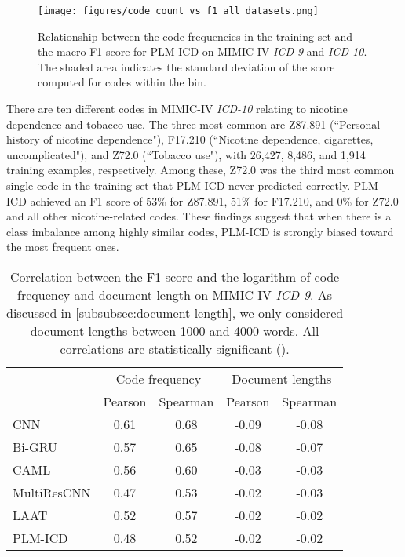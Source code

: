 \documentclass[anonymous=false, sigconf=true, review=false, natbib=true]{acmart}
\begin{document}
\begin{figure}[t]
    \centering
    \texttt{[image: figures/code\_count\_vs\_f1\_all\_datasets.png]}
\caption{Relationship between the code frequencies in the training set and the macro F1 score for PLM-ICD on MIMIC-IV \textit{ICD-9} and \textit{ICD-10}. The shaded area indicates the standard deviation of the score computed for codes within the bin.}
    \label{fig:icd9_vs_icd10}
\end{figure}

There are ten different codes in MIMIC-IV \textit{ICD-10} relating to nicotine dependence and tobacco use. The three most common are Z87.891 (``Personal history of nicotine dependence"), F17.210 (``Nicotine dependence, cigarettes, uncomplicated"), and Z72.0 (``Tobacco use"), with 26,427, 8,486, and 1,914 training examples, respectively. Among these, Z72.0 was the third most common single code in the training set that PLM-ICD never predicted correctly. PLM-ICD achieved an F1 score of 53\% for Z87.891, 51\% for F17.210, and 0\% for Z72.0 and all other nicotine-related codes. These findings suggest that when there is a class imbalance among highly similar codes, PLM-ICD is strongly biased toward the most frequent ones.

\begin{table}[t]
    \centering
    \caption{Correlation between the F1 score and the logarithm of code frequency and document length on MIMIC-IV \textit{ICD-9}. As discussed in \cref{subsubsec:document-length}, we only considered document lengths between 1000 and 4000 words. All correlations are statistically significant ().
}
    \label{tab:correlations}
    \begin{tabular}{lcccc}
    \toprule
     & \multicolumn{2}{c}{Code frequency} & \multicolumn{2}{c}{Document lengths}\\
     \cmidrule(lr){2-3}\cmidrule(lr){4-5}
     & Pearson & Spearman & Pearson & Spearman \\
    \midrule
    CNN  & 0.61 & 0.68 & -0.09 & -0.08 \\
    Bi-GRU & 0.57 & 0.65 & -0.08 & -0.07 \\
    CAML & 0.56 & 0.60 & -0.03 & -0.03   \\
    MultiResCNN & 0.47 & 0.53 & -0.02 & -0.03  \\
    LAAT & 0.52 & 0.57 & -0.02 & -0.02 \\
    PLM-ICD & 0.48 & 0.52 & -0.02 & -0.02   \\
    \bottomrule
    \end{tabular}
\end{table}
\end{document}
